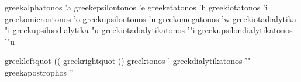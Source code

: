 
 greekalphatonos            {'a}
 greekepsilontonos          {'e}
 greeketatonos              {'h}
 greekiotatonos             {'i}
 greekomicrontonos          {'o}
 greekupsilontonos          {'u}
 greekomegatonos            {'w}
 greekiotadialytika         {"i}
 greekupsilondialytika      {"u}
 greekiotadialytikatonos    {'"i}
 greekupsilondialytikatonos {'"u}


 greekleftquot       {((}
 greekrightquot      {))}
 greektonos          {'}
 greekdialytikatonos {'"}
 greekapostrophos    {''}

\stopencoding


\startencoding[default]

